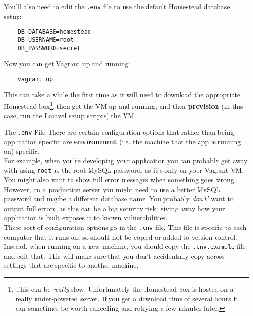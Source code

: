 You'll also need to edit the \texttt{.env} file to use the default Homestead database setup:

\begin{verbatim}
    DB_DATABASE=homestead
    DB_USERNAME=root
    DB_PASSWORD=secret
\end{verbatim}

Now you can get Vagrant up and running:

\begin{verbatim}
    vagrant up
\end{verbatim}

This can take a while the first time as it will need to download the appropriate Homestead box\footnote{This can be \textit{really} slow. Unfortunately the Homestead box is hosted on a really under-powered server. If you get a download time of several hours it can sometimes be worth cancelling and retrying a few minutes later.}, then get the VM up and running, and then \textbf{provision} (in this case, run the Laravel setup scripts) the VM.

\pagebreak

\begin{infobox}{The \texttt{.env} File}
    There are certain configuration options that rather than being application specific are \textbf{environment} (i.e. the machine that the app is running on) specific.
    \\

    For example, when you're developing your application you can probably get away with using \texttt{root} as the root MySQL password, as it's only on your Vagrant VM. You might also want to show full error messages when something goes wrong.
    \\

    However, on a production server you might need to use a better MySQL password and maybe a different database name. You probably \textit{don't'} want to output full errors, as this can be a big security risk: giving away how your application is built exposes it to known vulnerabilities.
    \\

    These sort of configuration options go in the \texttt{.env} file. This file is specific to each computer that it runs on, so should not be copied or added to version control. Instead, when running on a new machine, you should copy the \texttt{.env.example} file and edit that. This will make sure that you don't accidentally copy across settings that are specific to another machine.
\end{infobox}

